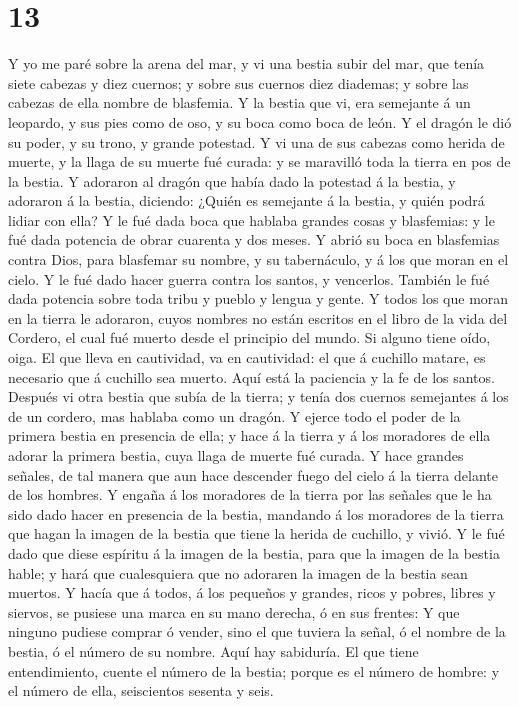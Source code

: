 \hypertarget{section-12}{%
\section{13}\label{section-12}}

 Y yo me paré sobre la arena del mar, y vi una bestia subir
del mar, que tenía siete cabezas y diez cuernos; y sobre sus cuernos
diez diademas; y sobre las cabezas de ella nombre de blasfemia.
 Y la bestia que vi, era semejante á un leopardo, y sus pies
como de oso, y su boca como boca de león. Y el dragón le dió su poder, y
su trono, y grande potestad.  Y vi una de sus cabezas como
herida de muerte, y la llaga de su muerte fué curada: y se maravilló
toda la tierra en pos de la bestia.  Y adoraron al dragón
que había dado la potestad á la bestia, y adoraron á la bestia,
diciendo: ¿Quién es semejante á la bestia, y quién podrá lidiar con
ella?  Y le fué dada boca que hablaba grandes cosas y
blasfemias: y le fué dada potencia de obrar cuarenta y dos meses.
 Y abrió su boca en blasfemias contra Dios, para blasfemar
su nombre, y su tabernáculo, y á los que moran en el cielo. 
Y le fué dado hacer guerra contra los santos, y vencerlos. También le
fué dada potencia sobre toda tribu y pueblo y lengua y gente.
 Y todos los que moran en la tierra le adoraron, cuyos
nombres no están escritos en el libro de la vida del Cordero, el cual
fué muerto desde el principio del mundo.  Si alguno tiene
oído, oiga.  El que lleva en cautividad, va en cautividad:
el que á cuchillo matare, es necesario que á cuchillo sea muerto. Aquí
está la paciencia y la fe de los santos.  Después vi otra
bestia que subía de la tierra; y tenía dos cuernos semejantes á los de
un cordero, mas hablaba como un dragón.  Y ejerce todo el
poder de la primera bestia en presencia de ella; y hace á la tierra y á
los moradores de ella adorar la primera bestia, cuya llaga de muerte fué
curada.  Y hace grandes señales, de tal manera que aun hace
descender fuego del cielo á la tierra delante de los hombres.
 Y engaña á los moradores de la tierra por las señales que
le ha sido dado hacer en presencia de la bestia, mandando á los
moradores de la tierra que hagan la imagen de la bestia que tiene la
herida de cuchillo, y vivió.  Y le fué dado que diese
espíritu á la imagen de la bestia, para que la imagen de la bestia
hable; y hará que cualesquiera que no adoraren la imagen de la bestia
sean muertos.  Y hacía que á todos, á los pequeños y
grandes, ricos y pobres, libres y siervos, se pusiese una marca en su
mano derecha, ó en sus frentes:  Y que ninguno pudiese
comprar ó vender, sino el que tuviera la señal, ó el nombre de la
bestia, ó el número de su nombre.  Aquí hay sabiduría. El
que tiene entendimiento, cuente el número de la bestia; porque es el
número de hombre: y el número de ella, seiscientos sesenta y seis.

